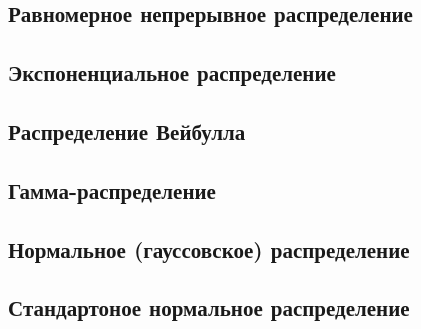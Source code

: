 \documentclass[12pt]{article}
\begin{document}
\subsection{Равномерное непрерывное распределение}
\subsection{Экспоненциальное распределение}
\subsection{Распределение Вейбулла}
\subsection{Гамма-распределение}
\subsection{Нормальное (гауссовское) распределение}
\subsection{Стандартоное нормальное распределение}
\end{document}

